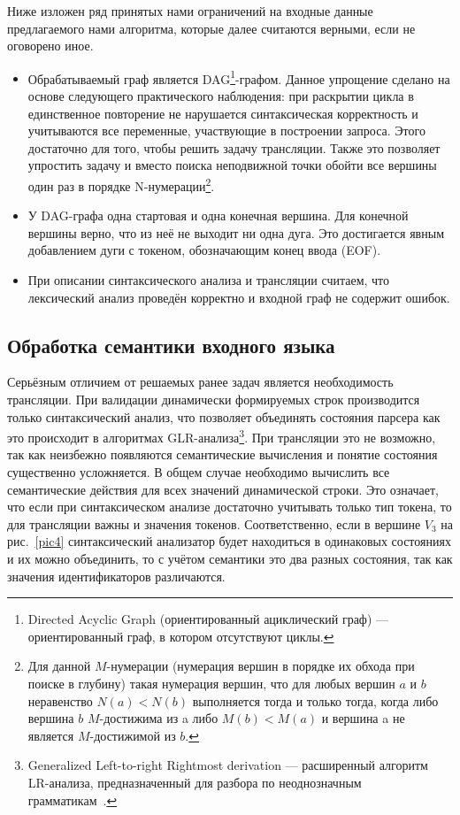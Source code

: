\documentclass[a5paper]{article}
\begin{document}
	Ниже изложен ряд принятых нами ограничений на входные данные предлагаемого нами алгоритма, которые далее считаются верными, если не оговорено иное.
	\begin{itemize}
        \item Обрабатываемый граф является DAG\footnote{Directed Acyclic Graph (ориентированный ациклический граф) —  ориентированный граф, в котором отсутствуют циклы.}-графом. Данное упрощение сделано на основе следующего практического наблюдения: при раскрытии цикла в единственное повторение не нарушается синтаксическая корректность и учитываются все переменные, участвующие в построении запроса. Этого достаточно для того, чтобы решить задачу трансляции. Также это  позволяет упростить задачу и вместо поиска неподвижной точки обойти все вершины один раз в порядке N-нумерации\footnote{Для данной $M$-нумерации (нумерация вершин в порядке их обхода при поиске в глубину) такая нумерация  вершин, что для любых вершин  $a$ и $b$ неравенство $N(a)<N(b)$ выполняется тогда и только тогда, когда либо вершина $b$ $M$-достижима из a либо $M(b)<M(a)$  и вершина a не является $M$-достижимой из $b$. }.
        \item У DAG-графа одна стартовая и одна конечная вершина. Для конечной вершины верно, что из неё не выходит ни одна дуга. Это достигается явным добавлением дуги с токеном, обозначающим конец ввода (EOF).
        \item При описании синтаксического анализа и трансляции считаем, что лексический анализ проведён корректно и входной граф не содержит ошибок.
    \end{itemize}


\subsection{Обработка семантики входного языка}

Серьёзным отличием от решаемых ранее задач является необходимость трансляции. При валидации динамически формируемых строк производится только синтаксический анализ, что позволяет объединять состояния парсера как это происходит в алгоритмах GLR-анализа\footnote{Generalized Left-to-right Rightmost derivation —  расширенный алгоритм LR-анализа, предназначенный для разбора по неоднозначным грамматикам~\cite{Grune}.}. При трансляции это не возможно, так как неизбежно появляются семантические вычисления и понятие состояния существенно усложняется. В общем случае необходимо вычислить все семантические действия для всех значений динамической строки. Это означает, что если при синтаксическом анализе достаточно учитывать только тип токена, то для трансляции важны и значения токенов. Соответственно, если в вершине $V_3$ на рис.~\ref{pic4} синтаксический анализатор будет находиться в одинаковых состояниях и их можно объединить, то с учётом семантики это два разных состояния, так как значения идентификаторов различаются.
\end{document}
